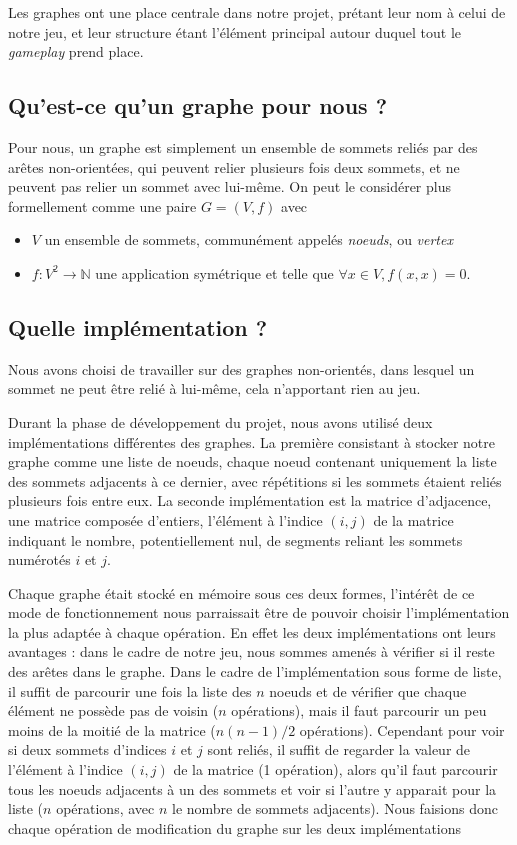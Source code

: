 \documentclass[12pt]{article}
\begin{document}
Les graphes ont une place centrale dans notre projet, prétant leur nom à celui de notre jeu, et leur structure étant l'élément principal autour duquel tout le \textit{gameplay} prend place.

\vskip 1cm

\subsection{Qu'est-ce qu'un graphe pour nous ?}
Pour nous, un graphe est simplement un ensemble de sommets reliés par des arêtes non-orientées, qui peuvent relier plusieurs fois deux sommets, et ne peuvent pas relier un sommet avec lui-même. On peut le considérer plus formellement comme une paire $ G = (V, f) $ avec
\vskip 0.25cm
\begin{itemize}
    \item $V$ un ensemble de sommets, communément appelés \textit{noeuds}, ou \textit{vertex}
    \item $f : V^2 \rightarrow \mathbb{N} $ une application symétrique et telle que $\forall x \in V, f(x, x) = 0$.
\end{itemize}

\subsection{Quelle implémentation ?}
Nous avons choisi de travailler sur des graphes non-orientés, dans lesquel un sommet ne peut être relié à lui-même, cela n'apportant rien au jeu.

Durant la phase de développement du projet, nous avons utilisé deux implémentations différentes des graphes. La première consistant à stocker notre graphe comme une liste de noeuds, chaque noeud contenant uniquement la liste des sommets adjacents à ce dernier, avec répétitions si les sommets étaient reliés plusieurs fois entre eux. La seconde implémentation est la matrice d'adjacence, une matrice composée d'entiers, l'élément à l'indice $(i,j)$ de la matrice indiquant le nombre, potentiellement nul, de segments reliant les sommets numérotés $i$ et $j$.

Chaque graphe était stocké en mémoire sous ces deux formes, l'intérêt de ce mode de fonctionnement nous parraissait être de pouvoir choisir l'implémentation la plus adaptée à chaque opération. En effet les deux implémentations ont leurs avantages : dans le cadre de notre jeu, nous sommes amenés à vérifier si il reste des arêtes dans le graphe. Dans le cadre de l'implémentation sous forme de liste, il suffit de parcourir une fois la liste des $n$ noeuds et de vérifier que chaque élément ne possède pas de voisin ($n$ opérations), mais il faut parcourir un peu moins de la moitié de la matrice ($n(n-1)/2$ opérations).
Cependant pour voir si deux sommets d'indices $i$ et $j$ sont reliés, il suffit de regarder la valeur de l'élément à l'indice $(i, j)$ de la matrice (1 opération), alors qu'il faut parcourir tous les noeuds adjacents à un des sommets et voir si l'autre y apparait pour la liste ($n$ opérations, avec $n$ le nombre de sommets adjacents). Nous faisions donc chaque opération de modification du graphe sur les deux implémentations
\end{document}
